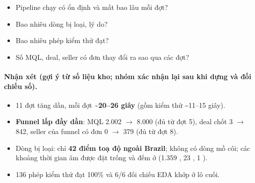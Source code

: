 \begin{itemize}
  \item Pipeline chạy có ổn định và mất bao lâu mỗi đợt?
  \item Bao nhiêu dòng bị loại, lý do?
  \item Bao nhiêu phép kiểm thử đạt?
  \item Số MQL, deal, seller có đơn thay đổi ra sao qua các đợt?
\end{itemize}



\paragraph{Nhận xét (gợi ý từ số liệu kho; \textbf{nhóm xác nhận lại sau khi dựng và đối chiếu số}).}

\begin{itemize}
  \item 11 đợt tăng dần, mỗi đợt \textbf{\textasciitilde{}20–26 giây} (gồm kiểm thử \textasciitilde{}11–15 giây).
  \item \textbf{Funnel lấp đầy dần}: MQL 2.002 $\rightarrow$ 8.000 (đủ từ đợt 5), deal chốt 3 $\rightarrow$ 842, seller của funnel có đơn 0 $\rightarrow$ 379 (đủ từ đợt 8).
  \item Dòng bị loại: chỉ \textbf{42 điểm toạ độ ngoài Brazil}; không có dòng mồ côi; các khoảng thời gian âm được đặt trống và đếm ở  (1.359 , 23 , 1 ).
  \item 136 phép kiểm thử đạt 100\% và 6/6 đối chiếu EDA khớp ở lô cuối.
\end{itemize}
